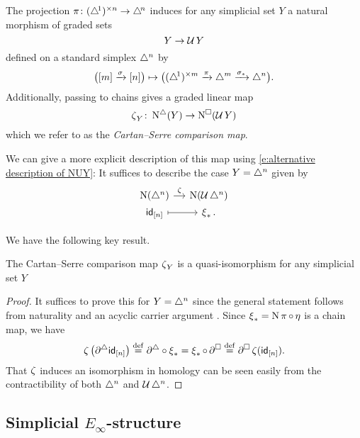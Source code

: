 The projection $\operatorname{\pi} \colon (\triangle^{\!1})^{\times n} \to \triangle^{\!n}$ induces for any simplicial set $Y$ a natural morphism of graded sets
\[
Y \to \operatorname{\mathcal{U}} Y
\]
defined on a standard simplex $\triangle^n$ by
\[
\big( [m] \xrightarrow{\sigma} [n] \big) \mapsto
\big( (\triangle^{\!1})^{\times m} \xrightarrow{\operatorname{\pi}} \triangle^m \xrightarrow{\sigma_\ast} \triangle^n \big).
\]
Additionally, passing to chains gives a graded linear map
\[
\operatorname{\zeta}_Y \colon \operatorname{N^{\triangle}}(Y) \to \operatorname{N^{\square}}(\operatorname{\mathcal{U}} Y)
\]
which we refer to as the \textit{Cartan--Serre comparison map}.

We can give a more explicit description of this map using \eqref{e:alternative description of NUY}:
It suffices to describe the case $Y = \triangle^n$ given by
\[
\begin{tikzcd}[column sep=small, row sep=0]
\chains(\simplex^n) \arrow[r, "\CScomp"] &
\chains(\cubify \simplex^n) \\
\id_{[n]} \arrow[r, mapsto] &
\CScollapse_\ast.
\end{tikzcd}
\]

We have the following key result.

\begin{lemma} \label{l:cartan serre quasi-iso}
	The Cartan--Serre comparison map $\operatorname{\zeta}_Y$ is a quasi-isomorphism for any simplicial set $Y$
\end{lemma}

\begin{proof}
	It suffices to prove this for $Y = \triangle^n$ since the general statement follows from naturality and an acyclic carrier argument \cite{eilenberg1953acyclic}.
	Since $\operatorname{\xi}_\ast = \operatorname{N} \operatorname{\pi} \circ \operatorname{\eta}$ is a chain map, we have
	\begin{align*}
	\operatorname{\zeta} \big( \partial^\triangle \mathsf{id}_{[n]} \big) \stackrel{\mathrm{def}}{=}
	\partial^\triangle \circ \operatorname{\xi}_\ast =
	\operatorname{\xi}_\ast \circ \, \partial^\square \stackrel{\mathrm{def}}{=}
	\partial^\square \operatorname{\zeta} (\mathsf{id}_{[n]}).
	\end{align*}
	That $\operatorname{\zeta}$ induces an isomorphism in homology can be seen easily from the contractibility of both $\triangle^n$ and $\operatorname{\mathcal{U}} \triangle^n$.
\end{proof}

\subsection{Simplicial $E_\infty$-structure} \label{ss:e infinity structures}

